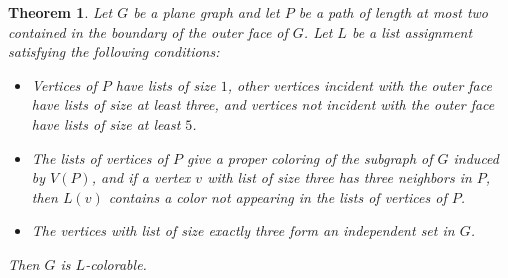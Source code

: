\documentclass[12pt,twoside,openright,a4paper]{book}
\newtheorem{theorem}{Theorem}[chapter]
\begin{document}
\begin{theorem}\label{thm:5choos-nonbook}
Let $G$ be a plane graph and let $P$ be a path of length at most two contained in the boundary of the
outer face of $G$.  Let $L$ be a list assignment satisfying the following conditions:
\begin{itemize}
\item[\textrm{(S)}] Vertices of $P$ have lists of size $1$, other vertices incident with the outer face have lists
of size at least three, and vertices not incident with the outer face have lists of size at least $5$.
\item[\textrm{(P)}] The lists of vertices of $P$ give a proper coloring of the subgraph of $G$ induced by $V(P)$,
and if a vertex $v$ with list of size three has three neighbors in $P$, then $L(v)$ contains a color not appearing
in the lists of vertices of $P$.
\item[\textrm{(I)}] The vertices with list of size exactly three form an independent set in $G$.
\end{itemize}
Then $G$ is $L$-colorable.
\end{theorem}
\end{document}
